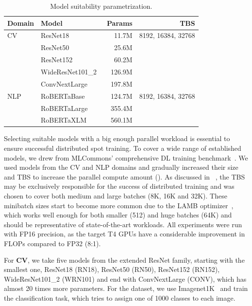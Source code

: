 \begin{table}[]
\begin{tabular}{llrr}
\textbf{Domain} & \textbf{Model} & \textbf{Params} & \textbf{TBS} \\ \hline
CV  & ResNet18~\cite{he2015deep} & 11.7M  & 8192,  16384, 32768 \\              
    & ResNet50~\cite{he2015deep}  & 25.6M  &  \\              
    & ResNet152~\cite{he2015deep} & 60.2M  &  \\              
    & WideResNet101\_2~\cite{zagoruyko2016wide} & 126.9M &  \\              
    & ConvNextLarge~\cite{liu2022convnet} & 197.8M &  \\ \hline
NLP & RoBERTaBase~\cite{liu2019roberta}  & 124.7M & 8192,  16384, 32768 \\
    & RoBERTaLarge~\cite{liu2019roberta} & 355.4M &  \\
    & RoBERTaXLM~\cite{conneau2020unsupervised} & 560.1M &  \\
\end{tabular}
\caption{Model suitability parametrization.}
\label{tab:experimental-setup-for-model-suitability}
\vspace*{-10mm}
\end{table}
Selecting suitable models with a big enough parallel workload is essential to ensure successful distributed spot training.
To cover a wide range of established models, we drew from MLCommons' comprehensive DL training benchmark~\cite{mattson2020mlperf}.
We used models from the CV and NLP domains and gradually increased their size and TBS to increase the parallel compute amount ().
As discussed in ~, the TBS may be exclusively responsible for the success of distributed training and was chosen to cover both medium and large batches (8K, 16K and 32K).
These minibatch sizes start to become more common due to the LAMB optimizer~\cite{you2019large}, which works well enough for both smaller (512) and huge batches (64K) and should be representative of state-of-the-art workloads.
All experiments were run with FP16 precision, as the target T4 GPUs have a considerable improvement in FLOPs compared to FP32 (8:1).

For \textbf{CV}, we take five models from the extended ResNet family, starting with the smallest one, ResNet18 (RN18), ResNet50 (RN50), ResNet152 (RN152), WideResNet101\_2 (WRN101) and end with ConvNextLarge (CONV), which has almost 20 times more parameters.
For the dataset, we use Imagenet1K~\cite{deng2009imagenet} and train the classification task, which tries to assign one of 1000 classes to each image.

